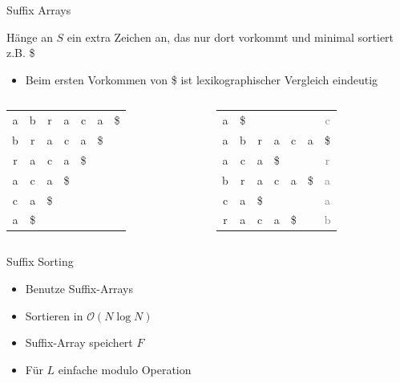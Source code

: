\documentclass[ngerman,aspectratio=169,10pt]{beamer}
\newcommand{\grey}[1]{\textcolor{gray}{#1}}
\begin{document}
\begin{frame}{Suffix Arrays}
    
    Hänge an $S$ ein extra Zeichen an, das nur dort vorkommt und minimal sortiert z.B. \$ 
    
    \begin{itemize}
        \item Beim ersten Vorkommen von \$ ist lexikographischer Vergleich eindeutig
    \end{itemize}
    
    \begin{columns}
	    \begin{column}{0.46\textwidth}
	        \begin{tabular}{ccccccc}
	            a&b&r&a&c&a&\$\\
	            b&r&a&c&a&\$&\\
	            r&a&c&a&\$&&\\
	            a&c&a&\$&&&\\
	            c&a&\$&&&&\\
	            a&\$&&&&&\\
	        \end{tabular}
	    \end{column}
	    \begin{column}{0.46\textwidth}
	        \begin{tabular}{ccccccc}
	            a&\$&&&&&\grey{c}\\
	            a&b&r&a&c&a&\$\\
	            a&c&a&\$&&&\grey{r}\\
	            b&r&a&c&a&\$&\grey{a}\\
	            c&a&\$&&&&\grey{a}\\
	            r&a&c&a&\$&&\grey{b}\\
	        \end{tabular}
	    \end{column}
    \end{columns}
\end{frame}

\begin{frame}{Suffix Sorting}
    \begin{itemize}
        \item Benutze Suffix-Arrays
        \item Sortieren in $\mathcal{O}(N\log N)$
        \item Suffix-Array speichert $F$
        \item Für $L$ einfache modulo Operation
    \end{itemize}
\end{frame}
\end{document}
